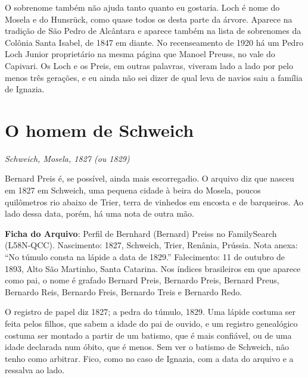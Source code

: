 \documentclass[
  brazilian,
  11pt,
  openany]{book}
\begin{document}
O sobrenome também não ajuda tanto quanto eu gostaria. Loch é nome do
Mosela e do Hunsrück, como quase todos os desta parte da árvore. Aparece
na tradição de São Pedro de Alcântara e aparece também na lista de
sobrenomes da Colônia Santa Isabel, de 1847 em diante. No recenseamento
de 1920 há um Pedro Loch Junior proprietário na mesma página que Manoel
Preuss, no vale do Capivari. Os Loch e os Preis, em outras palavras,
viveram lado a lado por pelo menos três gerações, e eu ainda não sei
dizer de qual leva de navios saiu a família de Ignazia.

\section{O homem de Schweich}\label{o-homem-de-schweich}

\emph{Schweich, Mosela, 1827 (ou 1829)}

Bernard Preis é, se possível, ainda mais escorregadio. O arquivo diz que
nasceu em 1827 em Schweich, uma pequena cidade à beira do Mosela, poucos
quilômetros rio abaixo de Trier, terra de vinhedos em encosta e de
barqueiros. Ao lado dessa data, porém, há uma nota de outra mão.

\begin{ficha}

\textbf{Ficha do Arquivo}: Perfil de Bernhard (Bernard) Preiss no
FamilySearch (L58N-QCC). Nascimento: 1827, Schweich, Trier, Renânia,
Prússia. Nota anexa: ``No túmulo consta na lápide a data de 1829.''
Falecimento: 11 de outubro de 1893, Alto São Martinho, Santa Catarina.
Nos índices brasileiros em que aparece como pai, o nome é grafado
Bernard Preis, Bernardo Preis, Bernard Preus, Bernardo Reis, Bernardo
Freis, Bernardo Treis e Bernardo Redo.

\end{ficha}

O registro de papel diz 1827; a pedra do túmulo, 1829. Uma lápide
costuma ser feita pelos filhos, que sabem a idade do pai de ouvido, e um
registro genealógico costuma ser montado a partir de um batismo, que é
mais confiável, ou de uma idade declarada num óbito, que é menos. Sem
ver o batismo de Schweich, não tenho como arbitrar. Fico, como no caso
de Ignazia, com a data do arquivo e a ressalva ao lado.
\end{document}
